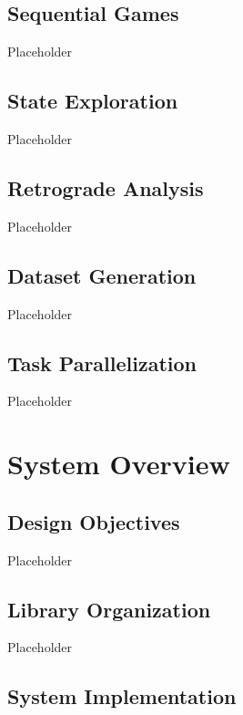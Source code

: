 \documentclass[conference]{IEEEtran}
\begin{document}
\subsection{Sequential Games}

Placeholder

\subsection{State Exploration}

Placeholder

\subsection{Retrograde Analysis}

Placeholder

\subsection{Dataset Generation}

Placeholder

\subsection{Task Parallelization}

Placeholder

\section{System Overview}

\subsection{Design Objectives}

Placeholder

\subsection{Library Organization}

Placeholder

\subsection{System Implementation}
\end{document}
